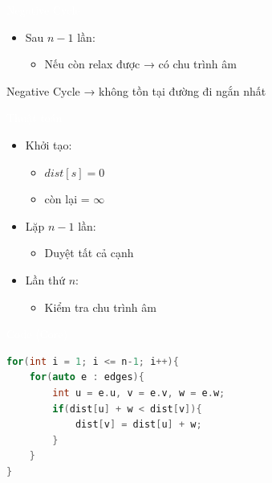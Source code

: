 \documentclass{beamer}
\newcommand{\hlred}[1]{\textcolor{myred}{#1}}
\newcommand{\hlwhite}[1]{\textcolor{white}{#1}}
\begin{document}

\begin{frame}{\hlwhite{Negative Cycle}}
\begin{itemize}
\item Sau $n-1$ lần:
\begin{itemize}
\item Nếu còn relax được → có chu trình âm
\end{itemize}
\end{itemize}

\begin{tcolorbox}
\centering
\hlred{Negative Cycle → không tồn tại đường đi ngắn nhất}
\end{tcolorbox}
\end{frame}


\begin{frame}{\hlwhite{Thuật toán}}
\begin{itemize}
\item Khởi tạo:
\begin{itemize}
\item $dist[s] = 0$
\item còn lại = $\infty$
\end{itemize}

\item Lặp $n-1$ lần:
\begin{itemize}
\item Duyệt tất cả cạnh
\end{itemize}

\item Lần thứ $n$:
\begin{itemize}
\item Kiểm tra chu trình âm
\end{itemize}
\end{itemize}
\end{frame}


\begin{frame}[fragile]{\hlwhite{Code (Core)}}
\begin{lstlisting}[language=C++]
for(int i = 1; i <= n-1; i++){
    for(auto e : edges){
        int u = e.u, v = e.v, w = e.w;
        if(dist[u] + w < dist[v]){
            dist[v] = dist[u] + w;
        }
    }
}
\end{lstlisting}
\end{frame}
\end{document}
